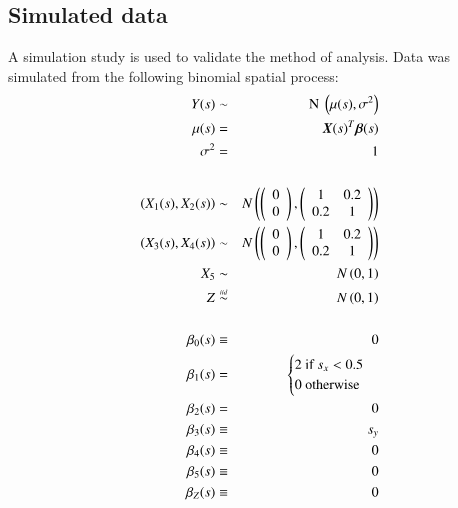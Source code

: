 \documentclass[authoryear ,review]{elsarticle}
\newcommand{\vect}[1]{\boldsymbol{#1}}
\begin{document}
		\subsection{Simulated data}
			 A simulation study is used to validate the method of analysis. Data was simulated from the following binomial spatial process:\\
			\begin{eqnarray*}
				Y(s) &\sim& \text{ N } \left(\mu(s), \sigma^2 \right)\\
				\mu(s) &=& \vect{X}(s)^T \vect{\beta}(s)\\
				\sigma^2 &=& 1\\
				\\
				\left( X_1(s), X_2(s) \right) &\sim& N \left( \left( \begin{array}{c} 0 \\ 0 \end{array} \right), \left( \begin{array}{cc} 1 & 0.2 \\ 0.2 & 1 \end{array} \right) \right)\\
				\left( X_3(s), X_4(s) \right) &\sim& N \left( \left( \begin{array}{c} 0 \\ 0 \end{array} \right), \left( \begin{array}{cc} 1 & 0.2 \\ 0.2 & 1 \end{array} \right) \right)\\
				X_5 &\sim& N \left( 0, 1 \right)\\
				Z &\stackrel{\mathsmaller{iid}}{\sim}& N \left( 0, 1 \right)\\
				\\
				\beta_0(s) &\equiv& 0\\				
				\beta_1(s) &=& \begin{cases}  2 \text{  if } s_x < 0.5 \\ 0 \text{  otherwise}  \end{cases}\\
				\beta_2(s) &=& 0\\
				\beta_3(s) &\equiv&  s_y\\\
				\beta_4(s) &\equiv& 0\\
				\beta_5(s) &\equiv& 0\\
				\beta_Z(s) &\equiv& 0\\				
			\end{eqnarray*}
			
\end{document}

